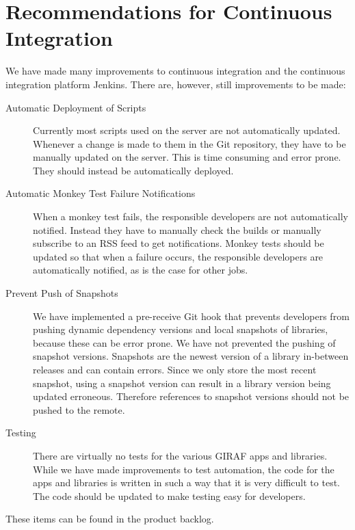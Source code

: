 \section{Recommendations for Continuous Integration}\label{sec:ci_recommendations}
We have made many improvements to continuous integration and the continuous integration platform Jenkins. There are, however, still improvements to be made:

\begin{description}
  \item[Automatic Deployment of Scripts] Currently most scripts used on the server are not automatically updated. Whenever a change is made to them in the Git repository, they have to be manually updated on the server. This is time consuming and error prone. They should instead be automatically deployed.
  \item[Automatic Monkey Test Failure Notifications] When a monkey test fails, the responsible developers are not automatically notified. Instead they have to manually check the builds or manually subscribe to an RSS feed to get notifications. Monkey tests should be updated so that when a failure occurs, the responsible developers are automatically notified, as is the case for other jobs.
  \item[Prevent Push of Snapshots] We have implemented a pre-receive Git hook that prevents developers from pushing dynamic dependency versions and local snapshots of libraries, because these can be error prone. We have not prevented the pushing of snapshot versions. Snapshots are the newest version of a library in-between releases and can contain errors. Since we only store the most recent snapshot, using a snapshot version can result in a library version being updated erroneous. Therefore references to snapshot versions should not be pushed to the remote.
  \item[Testing] There are virtually no tests for the various GIRAF apps and libraries. While we have made improvements to test automation, the code for the apps and libraries is written in such a way that it is very difficult to test. The code should be updated to make testing easy for developers.
\end{description}

These items can be found in the product backlog.